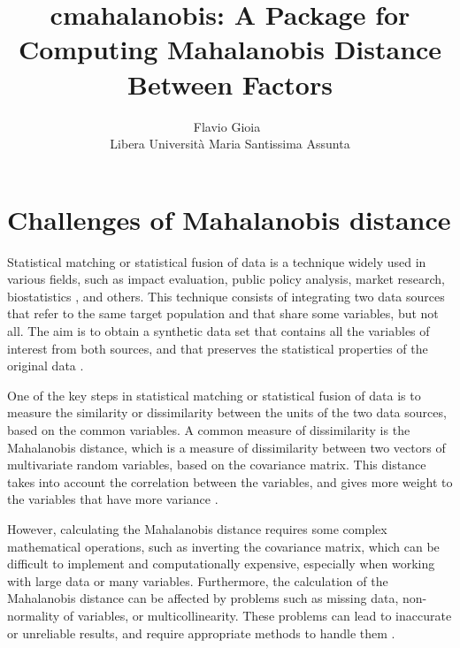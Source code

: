 \documentclass[article]{jss}
\author{Flavio Gioia~\orcidlink{0009-0000-0326-3840}\\Libera Università Maria Santissima Assunta}
\title{cmahalanobis: A \proglang{R} Package for Computing Mahalanobis Distance Between Factors}
\begin{document}


\section[Introduction: Challenges of Mahalanobis distance]{Challenges of Mahalanobis distance} \label{sec:intro}

Statistical matching or statistical fusion of data is a technique widely used in various fields, such as impact evaluation, public policy analysis, market research, biostatistics \cite{rao2015handbook}, and others. This technique consists of integrating two data sources that refer to the same target population and that share some variables, but not all. The aim is to obtain a synthetic data set that contains all the variables of interest from both sources, and that preserves the statistical properties of the original data \cite{d2018statistical}.

One of the key steps in statistical matching or statistical fusion of data is to measure the similarity or dissimilarity between the units of the two data sources, based on the common variables. A common measure of dissimilarity is the Mahalanobis distance, which is a measure of dissimilarity between two vectors of multivariate random variables, based on the covariance matrix. This distance takes into account the correlation between the variables, and gives more weight to the variables that have more variance \cite{mahalanobis1936generalized}.

However, calculating the Mahalanobis distance requires some complex mathematical operations, such as inverting the covariance matrix, which can be difficult to implement and computationally expensive, especially when working with large data or many variables. Furthermore, the calculation of the Mahalanobis distance can be affected by problems such as missing data, non-normality of variables, or multicollinearity. These problems can lead to inaccurate or unreliable results, and require appropriate methods to handle them \cite{de2016mahalanobis}.
\end{document}
